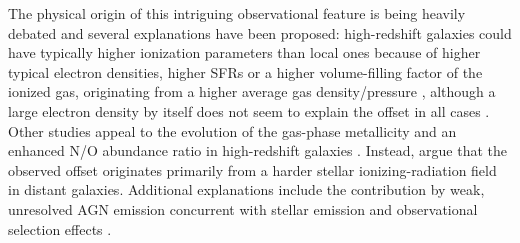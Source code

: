 \documentclass[fleqn,usenatbib]{mnras}
\begin{document}
The physical origin of this intriguing observational feature is being
heavily debated  and several explanations have been proposed:
high-redshift galaxies could have  typically higher ionization
parameters than local ones because of higher typical electron
densities, higher SFRs or a higher volume-filling factor of the
ionized gas,  originating from a higher average gas density/pressure
\citep[e.g.,][]{Brinchmann08,  Hainline09, Lehnert09, Steidel14,
  Hayashi15, Kashino17}, although a large electron  density by itself
does not seem to explain the offset in all cases
\citep[e.g.,][]{Rigby11, Hayashi15}. Other studies appeal to the
evolution of the gas-phase metallicity and an enhanced N/O abundance
ratio in high-redshift galaxies  \citep[e.g.,][]{Masters14, Shapley15,
  Masters16}. Instead, \citet[][see also
\citealt{Strom17}]{Steidel14, Steidel16} argue that the observed
offset originates primarily from a harder stellar ionizing-radiation
field in distant galaxies. Additional explanations include the
contribution by weak, unresolved AGN emission concurrent  with stellar
emission \citep[e.g.][]{Wright10} and observational selection effects
\citep{Juneau14}.  
\end{document}
